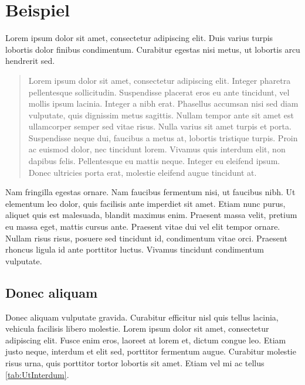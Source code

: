 \chapter{Beispiel} \label{ch:Beispiel}
Lorem ipsum dolor sit amet, consectetur adipiscing elit. Duis varius turpis lobortis dolor finibus condimentum. Curabitur egestas nisi metus, ut lobortis arcu hendrerit sed. 
\begin{quote}Lorem ipsum dolor sit amet, consectetur adipiscing elit. Integer pharetra pellentesque sollicitudin. Suspendisse placerat eros eu ante tincidunt, vel mollis ipsum lacinia. Integer a nibh erat. Phasellus accumsan nisi sed diam vulputate, quis dignissim metus sagittis. Nullam tempor ante sit amet est ullamcorper semper sed vitae risus. Nulla varius sit amet turpis et porta. Suspendisse neque dui, faucibus a metus at, lobortis tristique turpis. Proin ac euismod dolor, nec tincidunt lorem. Vivamus quis interdum elit, non dapibus felis. Pellentesque eu mattis neque. Integer eu eleifend ipsum. Donec ultricies porta erat, molestie eleifend augue tincidunt at.\end{quote}
Nam fringilla egestas ornare. Nam faucibus fermentum nisi, ut faucibus nibh. Ut elementum leo dolor, quis facilisis ante imperdiet sit amet. Etiam nunc purus, aliquet quis est malesuada, blandit maximus enim. Praesent massa velit, pretium eu massa eget, mattis cursus ante. Praesent vitae dui vel elit tempor ornare. Nullam risus risus, posuere sed tincidunt id, condimentum vitae orci. Praesent rhoncus ligula id ante porttitor luctus. Vivamus tincidunt condimentum vulputate. 

\section{Donec aliquam} \label{sec:DonecAliquam}
 Donec aliquam vulputate gravida. Curabitur efficitur nisl quis tellus lacinia, vehicula facilisis libero molestie. Lorem ipsum dolor sit amet, consectetur adipiscing elit. Fusce enim eros, laoreet at lorem et, dictum congue leo. Etiam justo neque, interdum et elit sed, porttitor fermentum augue. Curabitur molestie risus urna, quis porttitor tortor lobortis sit amet. Etiam vel mi ac tellus \ref{tab:UtInterdum}.
 
